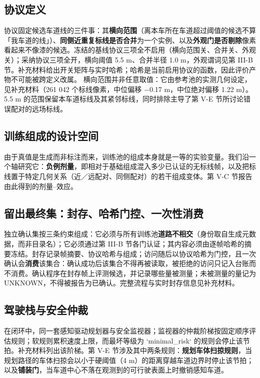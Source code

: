 \documentclass[journal]{IEEEtran}
\begin{document}
\subsection{协议定义}
协议固定候选车道线的三件事：其\textbf{横向范围}（离本车所在车道超过阈值的候选不算「我车道的线」）、\textbf{同侧近重复标线是否合并}为一个实例、以及\textbf{外观门是否剔除}像素看起来不像漆的候选。冻结的基线协议三项全不启用（横向范围关、合并关、外观关）；采纳协议三项全开，横向阈值 5.5 m、合并半径 1.0 m，外观谓词见第 III-B 节。补充材料给出开关矩阵与实时哈希；哈希是当前启用协议的函数，因此评价产物不可能被跨定义改属。
横向范围并非任意取值：它由参考池的实测几何设定，见补充材料（261 042 个标线像素，中位偏移 −0.17 m，中位绝对偏移 1.22 m）。5.5 m 的范围保留本车道标线及其紧邻标线，同时排除主导了第 V-E 节所讨论错误配对的远场标线。
\subsection{训练组成的设计空间}
由于真值是生成而非标注而来，训练池的组成本身就是一等的实验变量。我们沿一个轴研究它：\textbf{负例剂量}，即相对于基础组成混入多少已认证的无标线帧，以及把标线置于特定几何关系（近／远配对、同侧配对）的若干组成变体。第 V-C 节报告由此得到的剂量--效应。
\subsection{留出最终集：封存、哈希门控、一次性消费}
独立确认集按三条约束组成：它必须与所有训练池\textbf{道路不相交}（身份取自生成元数据，而非目录名）；它必须通过第 III-B 节各门认证；其内容必须由逐帧哈希的摘要冻结。封存记录帧摘要、协议哈希与组成；访问随后以协议哈希为门控，且一次确认会\textbf{消费}该集合：确认成功后该集合不得再被读取，被拒绝的访问只记入台账而不消费。确认程序在封存帧上评测候选，并记录哪些量被测量；未被测量的量记为 UNKNOWN，不得被报告为已确认。完整流程与实时封存信息见补充材料。
\subsection{驾驶栈与安全仲裁}
在闭环中，同一套感知驱动规划器与安全监视器；监视器的仲裁阶梯按固定顺序评估规则；软规则累积速度上限，而最坏等级为 `minimal_risk` 的规则会停止该节拍。补充材料列出该阶梯。第 V-E 节涉及其中两条规则：\textbf{规划车体扫掠规则}，当规划路径的车体扫掠会以小于硬阈值（4 m）的距离穿越车道边界时停止该节拍；以及\textbf{铺装门}，当车道中心不落在观测到的可行驶表面上时撤销感知车道。
\end{document}
